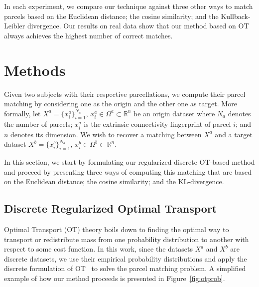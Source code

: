 In each experiment, we compare our technique against three other ways to match parcels based on the Euclidean distance; the cosine similarity; and the Kullback-Leibler divergence. Our results on real data show that our method based on OT always achieves the highest number of correct matches.


\section{Methods}

Given two subjects with their respective parcellations, we compute their parcel matching by considering one as the origin and the other one as target. 
More formally, let $X^a = \{x^a_i\}_{i=1}^{N_a}$, $x^a_i \in \Omega^a \subset \mathbb{R}^n$ be an origin dataset where $N_a$ denotes the number of parcels; $x^a_i$ is the extrinsic connectivity fingerprint of parcel $i$; and $n$ denotes its dimension. We wish to recover a matching between $X^a$ and a target dataset ${X^b = \{x^b_i\}_{i=1}^{N_b}}$, $x^b_i \in \Omega^b \subset \mathbb{R}^n$.


In this section, we start by formulating our  regularized discrete OT-based method and proceed by presenting three ways of computing this matching that are based on the Euclidean distance; the cosine similarity; and the KL-divergence.

\subsection{Discrete Regularized Optimal Transport}

Optimal Transport (OT) theory boils down to finding the optimal way to  transport or redistribute mass from one probability distribution to another with respect to some cost function.
In this work, since the datasets $X^a$ and $X^b$ are discrete datasets, we use their empirical probability distributions and apply the discrete formulation of OT~\cite{nathalie,remi} to solve the parcel matching problem. A simplified example of how our method proceeds is presented in Figure~\ref{fig:otprob}.

